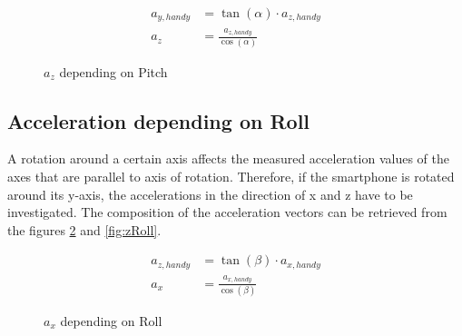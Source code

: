 \documentclass[12pt, a4paper, oneside, british]{article}
\begin{document}
\begin{figure}[htb]
    \centering
    \begin{minipage}{0.5\textwidth}
        \centering
        \captionsetup{justification=centering}
        
        \caption{$a_z$ depending on Pitch}
        \label{fig:zPitch}
    \end{minipage}%
    \hfill
    \begin{minipage}{0.5\textwidth}
        \centering
			\begin{align} 
				a_{y, handy} &= \tan(\alpha) \cdot a_{z, handy}\\ 
				a_z &= \frac{a_{z, handy}}{\cos(\alpha)}
			\end{align}
    \end{minipage}
\end{figure}

\FloatBarrier
\subsection{Acceleration depending on Roll}
A rotation around a certain axis affects the measured acceleration values of the
axes that are parallel to axis of rotation. Therefore, if the smartphone is
rotated around its y-axis, the accelerations in the direction of x and z have to
be investigated. The composition of the acceleration vectors can be retrieved
from the figures \ref{fig:xRoll} and \ref{fig:zRoll}.

\begin{figure}[htb]
    \centering
    \begin{minipage}{0.5\textwidth}
        \centering
        \captionsetup{justification=centering}
        
        \caption{$a_x$ depending on Roll}
        \label{fig:xRoll}
    \end{minipage}%
    \hfill
    \begin{minipage}{0.5\textwidth}
        \centering
			\begin{align} 
				a_{z, handy} &= \tan(\beta) \cdot {a_{x, handy}}\\
				a_x &= \frac{a_{x, handy}}{\cos(\beta)}
			\end{align}
    \end{minipage}
\end{figure}
\end{document}
